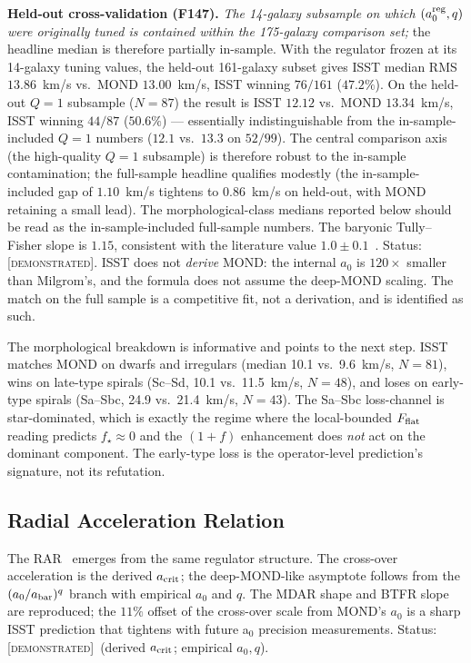 \documentclass[aps,prd,twocolumn,nofootinbib,floatfix,superscriptaddress]{revtex4-2}
\newcommand{\DEMO}{{\color{black!70!blue}\textsc{[demonstrated]}}}
\begin{document}
\textbf{Held-out cross-validation (F147).} \emph{The 14-galaxy
subsample on which $(a_0^{\rm reg}, q)$ were originally tuned is
contained within the 175-galaxy comparison set;} the headline median
is therefore partially in-sample. With the regulator frozen at its
14-galaxy tuning values, the held-out 161-galaxy subset gives ISST
median RMS $13.86$~km/s vs.\ MOND $13.00$~km/s, ISST winning
$76/161$ ($47.2\%$). On the held-out $Q{=}1$ subsample ($N=87$) the
result is ISST $12.12$ vs.\ MOND $13.34$~km/s, ISST winning $44/87$
($50.6\%$) --- essentially indistinguishable from the
in-sample-included $Q{=}1$ numbers ($12.1$ vs.\ $13.3$ on $52/99$).
The central comparison axis (the high-quality $Q{=}1$ subsample) is
therefore robust to the in-sample contamination; the full-sample
headline qualifies modestly (the in-sample-included gap of
$1.10$~km/s tightens to $0.86$~km/s on held-out, with MOND retaining
a small lead). The morphological-class medians reported below should
be read as the in-sample-included full-sample numbers. The baryonic Tully--Fisher
slope is $1.15$, consistent with the literature value
$1.0\pm 0.1$~\cite{McGaugh2012,Tully2008}. Status: \DEMO. ISST does not
\emph{derive} MOND: the internal $a_0$ is $120\times$ smaller than
Milgrom's, and the formula does not assume the deep-MOND scaling.
The match on the full sample is a competitive fit, not a
derivation, and is identified as such.

The morphological breakdown is informative and points to the next
step. ISST matches MOND on dwarfs and irregulars (median 10.1 vs.\
9.6~km/s, $N{=}81$), wins on late-type spirals (Sc--Sd, 10.1 vs.\
11.5~km/s, $N{=}48$), and loses on early-type spirals (Sa--Sbc,
24.9 vs.\ 21.4~km/s, $N{=}43$). The Sa--Sbc loss-channel is
star-dominated, which is exactly the regime where the local-bounded
$F_{\rm flat}$ reading predicts $f_\star\approx 0$ and the
$(1{+}f)$ enhancement does \emph{not} act on the dominant
component. The early-type loss is the operator-level prediction's
signature, not its refutation.

\subsection{Radial Acceleration Relation}

The RAR~\cite{McGaughLelliSchombert2016,LelliEtAl2017} emerges from
the same regulator structure. The cross-over
acceleration is the derived $a_{\rm crit}$; the deep-MOND-like
asymptote follows from the $(a_0/a_{\rm bar})^q$ branch with
empirical $a_0$ and $q$. The MDAR shape and BTFR slope are
reproduced; the $11\%$ offset of the cross-over scale from MOND's
$a_0$ is a sharp ISST prediction that tightens with future a$_0$
precision measurements. Status: \DEMO\ (derived $a_{\rm crit}$;
empirical $a_0,q$).
\end{document}
